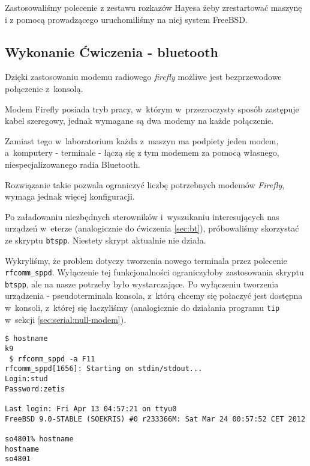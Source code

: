 Zastosowaliśmy polecenie z zestawu rozkazów Hayesa żeby zrestartować maszynę \zielone{} i z pomocą prowadzącego uruchomiliśmy na niej system FreeBSD.

\subsection{Wykonanie Ćwiczenia - bluetooth}
Dzięki zastosowaniu modemu radiowego \emph{firefly} możliwe jest bezprzewodowe połączenie z~konsolą.

Modem Firefly posiada tryb pracy, w~którym w~przezroczysty sposób zastępuje kabel szeregowy, jednak wymagane są dwa modemy na każde połączenie.

Zamiast tego w~laboratorium każda z~maszyn \zielone{} ma podpiety jeden modem, a~komputery - terminale - łączą się z tym modemem za pomocą własnego, niespecjalizowanego radia Bluetooth.

Rozwiązanie takie pozwala ograniczyć liczbę potrzebnych modemów \emph{Firefly}, wymaga jednak więcej konfiguracji.

Po załadowaniu niezbędnych sterowników i~wyszukaniu interesujących nas urządzeń w~eterze (analogicznie do ćwiczenia \ref{sec:bt}), próbowaliśmy skorzystać ze skryptu \texttt{bt\dywiz spp}.
Niestety skrypt aktualnie nie działa.

Wykryliśmy, że problem dotyczy tworzenia nowego terminala przez polecenie \texttt{rfcomm\_sppd}.
Wyłączenie tej funkcjonalności ograniczyłoby zastosowania skryptu \texttt{bt\dywiz spp}, ale na nasze potrzeby było wystarczające.
Po wyłączeniu tworzenia urządzenia - pseudo\dywiz terminala konsola, z~którą chcemy się połaczyć jest dostępna w~konsoli, z~której się łaczyliśmy (analogicznie do działania programu \texttt{tip} w~sekcji \ref{sec:serial:null-modem}).

\begin{lstlisting}[caption={Połączenie z konsolą za pomocą programu \texttt{rfcomm\_sppd}}]
 $ hostname
k9
 $ rfcomm_sppd -a F11
rfcomm_sppd[1656]: Starting on stdin/stdout...
Login:stud
Password:zetis

Last login: Fri Apr 13 04:57:21 on ttyu0
FreeBSD 9.0-STABLE (SOEKRIS) #0 r233366M: Sat Mar 24 00:57:52 CET 2012

so4801% hostname
hostname
so4801
\end{lstlisting}
